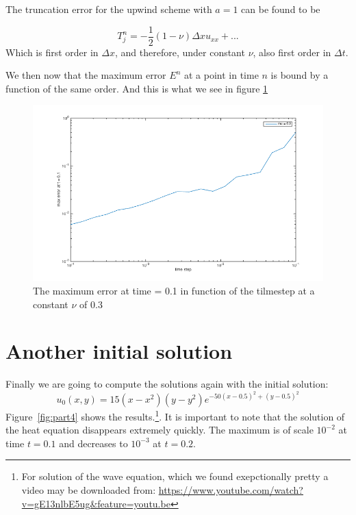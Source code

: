 The truncation error for the upwind scheme with $a=1$ can be found to be

\begin{equation}
T_j^n = -\frac{1}{2}(1-\nu)\Delta x u_{xx} + ...
\end{equation}
Which is first order in $\Delta x$, and therefore, under constant $\nu$, also first order in $\Delta t$.

We then now that the maximum error $E^n$ at a point in time $n$ is bound by a function of the same order. And this is what we see in figure \ref{errororrrTransport}

\begin{figure}[htbp] %
   \centering
   \includegraphics[scale=0.3]{images/errororrrTransport} 
   \caption{The maximum error at time = 0.1 in function of the tilmestep at a constant $\nu$ of 0.3 }
   \label{errororrrTransport}
\end{figure}




\section{Another initial solution}
Finally we are going to compute the solutions again with the initial solution:
\begin{equation}
u_0(x,y) = 15(x-x^2)(y - y^2) e^{-50(x-0.5)^2 + (y-0.5)^2}
\end{equation}
Figure~\ref*{fig:part4} shows the results.\footnote{For solution of the wave equation, which we found exepctionally pretty a video may be downloaded from: \url{https://www.youtube.com/watch?v=gE13nlbE5ug&feature=youtu.be}}. It is important to note that the solution of the heat equation disappears extremely quickly. The maximum is of scale $10^{-2}$ at time $t = 0.1$ and decreases to $10^{-3}$ at $t=0.2$.

